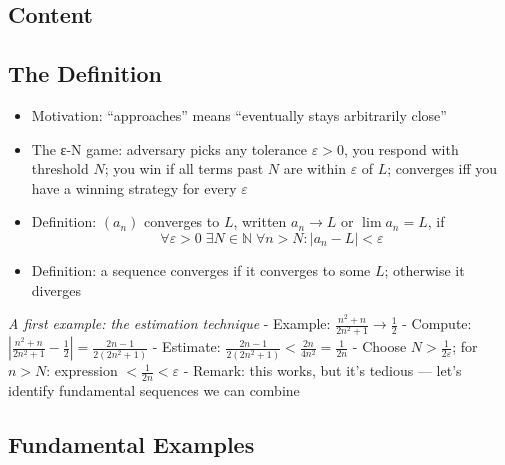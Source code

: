 \documentclass[
  10pt,
  letterpaper,
]{scrbook}
\providecommand{\tightlist}{%
  \setlength{\itemsep}{0pt}\setlength{\parskip}{0pt}}
\newcommand{\NN}{\mathbb{N}}
\begin{document}
\subsection{Content}\label{content-6}

\subsection{The Definition}\label{the-definition}

\begin{itemize}
\tightlist
\item
  Motivation: ``approaches'' means ``eventually stays arbitrarily
  close''
\item
  The ε-N game: adversary picks any tolerance \(\varepsilon > 0\), you
  respond with threshold \(N\); you win if all terms past \(N\) are
  within \(\varepsilon\) of \(L\); converges iff you have a winning
  strategy for every \(\varepsilon\)
\item
  Definition: \((a_n)\) converges to \(L\), written \(a_n \to L\) or
  \(\lim a_n = L\), if
  \[\forall \varepsilon > 0 \; \exists N \in \NN \; \forall n > N: |a_n - L| < \varepsilon\]
\item
  Definition: a sequence converges if it converges to some \(L\);
  otherwise it diverges
\end{itemize}

\emph{A first example: the estimation technique} - Example:
\(\frac{n^2 + n}{2n^2 + 1} \to \frac{1}{2}\) - Compute:
\(\left| \frac{n^2 + n}{2n^2 + 1} - \frac{1}{2} \right| = \frac{2n - 1}{2(2n^2 + 1)}\)
- Estimate:
\(\frac{2n - 1}{2(2n^2 + 1)} < \frac{2n}{4n^2} = \frac{1}{2n}\) - Choose
\(N > \frac{1}{2\varepsilon}\); for \(n > N\): expression
\(< \frac{1}{2n} < \varepsilon\) - Remark: this works, but it's tedious
--- let's identify fundamental sequences we can combine

\subsection{Fundamental Examples}\label{fundamental-examples}
\end{document}
